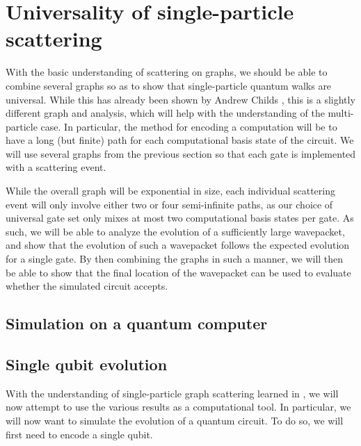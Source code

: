 \documentclass[../thesis-main/thesis-main]{subfiles}
\begin{document}
\chapter{Universality of single-particle scattering}
\label{chap:SP_universality}



With the basic understanding of scattering on graphs, we should be able to combine several graphs so as to show that single-particle quantum walks are universal.  While this has already been shown by Andrew Childs \cite{Chi09}, this is a slightly different graph and analysis, which will help with the understanding of the multi-particle case.  In particular, the method for encoding a computation will be to have a long (but finite) path for each computational basis state of the circuit.  We will use several graphs from the previous section so that each gate is implemented with a scattering event.  

While the overall graph will be exponential in size, each individual scattering event will only involve either two or four semi-infinite paths, as our choice of universal gate set only mixes at most two computational basis states per gate.  As such, we will be able to analyze the evolution of a sufficiently large wavepacket, and show that the evolution of such a wavepacket follows the expected evolution for a single gate.  By then combining the graphs in such a manner, we will then be able to show that the final location of the wavepacket can be used to evaluate whether the simulated circuit accepts.




\section{Simulation on a quantum computer}



\section{Single qubit evolution}\label{sec:single_qubit_evolution}

With the understanding of single-particle graph scattering learned in , we will now attempt to use the various results as a computational tool.  In particular, we will now want to simulate the evolution of a quantum circuit.  To do so, we will first need to encode a single qubit.
\end{document}
